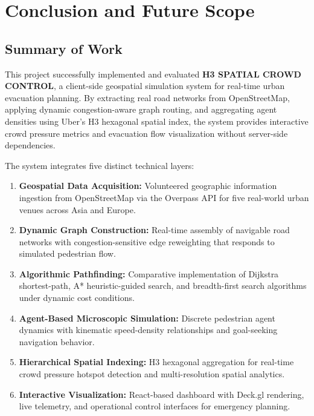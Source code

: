 \documentclass[12pt,a4paper,oneside]{report}
\begin{document}
\chapter{Conclusion and Future Scope}

\section{Summary of Work}
This project successfully implemented and evaluated \textbf{H3 SPATIAL CROWD CONTROL}, a client-side geospatial simulation system for real-time urban evacuation planning. By extracting real road networks from OpenStreetMap, applying dynamic congestion-aware graph routing, and aggregating agent densities using Uber's H3 hexagonal spatial index, the system provides interactive crowd pressure metrics and evacuation flow visualization without server-side dependencies. 

The system integrates five distinct technical layers:
\begin{enumerate}
    \item \textbf{Geospatial Data Acquisition:} Volunteered geographic information ingestion from OpenStreetMap via the Overpass API for five real-world urban venues across Asia and Europe.
    \item \textbf{Dynamic Graph Construction:} Real-time assembly of navigable road networks with congestion-sensitive edge reweighting that responds to simulated pedestrian flow.
    \item \textbf{Algorithmic Pathfinding:} Comparative implementation of Dijkstra shortest-path, A* heuristic-guided search, and breadth-first search algorithms under dynamic cost conditions.
    \item \textbf{Agent-Based Microscopic Simulation:} Discrete pedestrian agent dynamics with kinematic speed-density relationships and goal-seeking navigation behavior.
    \item \textbf{Hierarchical Spatial Indexing:} H3 hexagonal aggregation for real-time crowd pressure hotspot detection and multi-resolution spatial analytics.
    \item \textbf{Interactive Visualization:} React-based dashboard with Deck.gl rendering, live telemetry, and operational control interfaces for emergency planning.
\end{enumerate}
\end{document}
